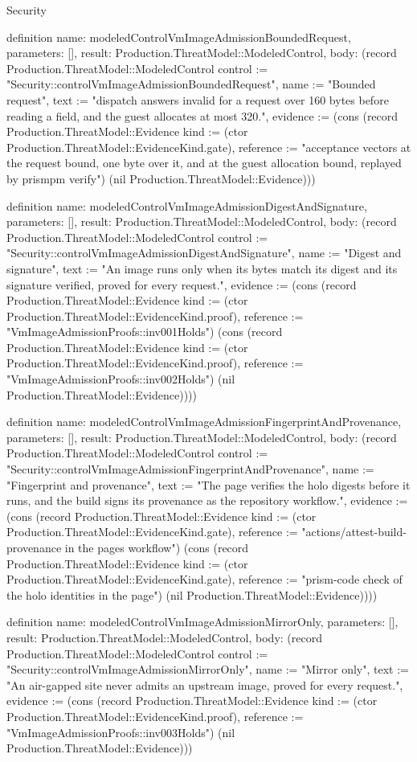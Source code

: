 \begin{lexlean}{Security}
\begin{semanticmodule}
definition{
  name: modeledControlVmImageAdmissionBoundedRequest,
  parameters: [],
  result: Production.ThreatModel::ModeledControl,
  body: (record Production.ThreatModel::ModeledControl {control := "Security::controlVmImageAdmissionBoundedRequest", name := "Bounded request", text := "dispatch answers invalid for a request over 160 bytes before reading a field, and the guest allocates at most 320.", evidence := (cons (record Production.ThreatModel::Evidence {kind := (ctor Production.ThreatModel::EvidenceKind.gate), reference := "acceptance vectors at the request bound, one byte over it, and at the guest allocation bound, replayed by prismpm verify"}) (nil Production.ThreatModel::Evidence))})
}

definition{
  name: modeledControlVmImageAdmissionDigestAndSignature,
  parameters: [],
  result: Production.ThreatModel::ModeledControl,
  body: (record Production.ThreatModel::ModeledControl {control := "Security::controlVmImageAdmissionDigestAndSignature", name := "Digest and signature", text := "An image runs only when its bytes match its digest and its signature verified, proved for every request.", evidence := (cons (record Production.ThreatModel::Evidence {kind := (ctor Production.ThreatModel::EvidenceKind.proof), reference := "VmImageAdmissionProofs::inv001Holds"}) (cons (record Production.ThreatModel::Evidence {kind := (ctor Production.ThreatModel::EvidenceKind.proof), reference := "VmImageAdmissionProofs::inv002Holds"}) (nil Production.ThreatModel::Evidence)))})
}

definition{
  name: modeledControlVmImageAdmissionFingerprintAndProvenance,
  parameters: [],
  result: Production.ThreatModel::ModeledControl,
  body: (record Production.ThreatModel::ModeledControl {control := "Security::controlVmImageAdmissionFingerprintAndProvenance", name := "Fingerprint and provenance", text := "The page verifies the holo digests before it runs, and the build signs its provenance as the repository workflow.", evidence := (cons (record Production.ThreatModel::Evidence {kind := (ctor Production.ThreatModel::EvidenceKind.gate), reference := "actions/attest-build-provenance in the pages workflow"}) (cons (record Production.ThreatModel::Evidence {kind := (ctor Production.ThreatModel::EvidenceKind.gate), reference := "prism-code check of the holo identities in the page"}) (nil Production.ThreatModel::Evidence)))})
}

definition{
  name: modeledControlVmImageAdmissionMirrorOnly,
  parameters: [],
  result: Production.ThreatModel::ModeledControl,
  body: (record Production.ThreatModel::ModeledControl {control := "Security::controlVmImageAdmissionMirrorOnly", name := "Mirror only", text := "An air-gapped site never admits an upstream image, proved for every request.", evidence := (cons (record Production.ThreatModel::Evidence {kind := (ctor Production.ThreatModel::EvidenceKind.proof), reference := "VmImageAdmissionProofs::inv003Holds"}) (nil Production.ThreatModel::Evidence))})
}


\end{semanticmodule}
\end{lexlean}
